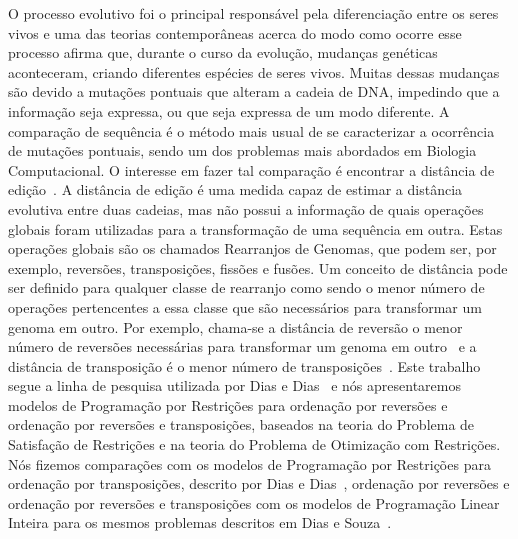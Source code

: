 O processo evolutivo foi o principal responsável pela diferenciação
entre os seres vivos e uma das teorias contemporâneas acerca do modo
como ocorre esse processo afirma que, durante o curso da evolução,
mudanças genéticas aconteceram, criando diferentes espécies de seres
vivos. Muitas dessas mudanças são devido a mutações pontuais que
alteram a cadeia de DNA, impedindo que a informação seja expressa, ou
que seja expressa de um modo diferente. A comparação de sequência é o
método mais usual de se caracterizar a ocorrência de mutações
pontuais, sendo um dos problemas mais abordados em Biologia
Computacional. O interesse em fazer tal comparação é encontrar a
distância de edição~\cite{SetubalMeidanis*1997}. A distância de edição
é uma medida capaz de estimar a distância evolutiva entre duas
cadeias, mas não possui a informação de quais operações globais foram
utilizadas para a transformação de uma sequência em outra. Estas
operações globais são os chamados Rearranjos de Genomas, que podem
ser, por exemplo, reversões, transposições, fissões e fusões. Um
conceito de distância pode ser definido para qualquer classe de
rearranjo como sendo o menor número de operações pertencentes a essa
classe que são necessários para transformar um genoma em outro. Por
exemplo, chama-se a distância de reversão o menor número de reversões
necessárias para transformar um genoma em
outro~\cite{BafnaPevzner*1996} e a distância de transposição é o menor
número de transposições~\cite{BafnaPevzner*1998}. Este trabalho segue
a linha de pesquisa utilizada por Dias e Dias~\cite{DiasDias*2009} e
nós apresentaremos modelos de Programação por Restrições para
ordenação por reversões e ordenação por reversões e transposições,
baseados na teoria do Problema de Satisfação de Restrições e na teoria
do Problema de Otimização com Restrições. Nós fizemos comparações com
os modelos de Programação por Restrições para ordenação por
transposições, descrito por Dias e Dias~\cite{DiasDias*2009},
ordenação por reversões e ordenação por reversões e transposições com
os modelos de Programação Linear Inteira para os mesmos problemas
descritos em Dias e Souza~\cite{DiasSouza*2007}.
